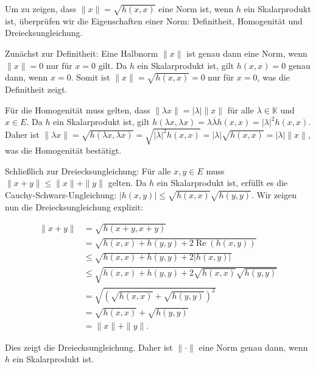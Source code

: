 Um zu zeigen, dass $\|x\| = \sqrt{h(x, x)}$ eine Norm ist, wenn $h$ ein Skalarprodukt ist, überprüfen wir die Eigenschaften einer Norm: Definitheit, Homogenität und Dreiecksungleichung.

Zunächst zur Definitheit: Eine Halbnorm $\|x\|$ ist genau dann eine Norm, wenn $\|x\| = 0$ nur für $x = 0$ gilt. Da $h$ ein Skalarprodukt ist, gilt $h(x, x) = 0$ genau dann, wenn $x = 0$. Somit ist $\|x\| = \sqrt{h(x, x)} = 0$ nur für $x = 0$, was die Definitheit zeigt.

Für die Homogenität muss gelten, dass $\|\lambda x\| = |\lambda| \|x\|$ für alle $\lambda \in \mathbb{K}$ und $x \in E$. Da $h$ ein Skalarprodukt ist, gilt $h(\lambda x, \lambda x) = \lambda \overline{\lambda} h(x, x) = |\lambda|^2 h(x, x)$. Daher ist $\|\lambda x\| = \sqrt{h(\lambda x, \lambda x)} = \sqrt{|\lambda|^2 h(x, x)} = |\lambda| \sqrt{h(x, x)} = |\lambda| \|x\|$, was die Homogenität bestätigt.

Schließlich zur Dreiecksungleichung: Für alle $x, y \in E$ muss $\|x + y\| \leq \|x\| + \|y\|$ gelten. Da $h$ ein Skalarprodukt ist, erfüllt es die Cauchy-Schwarz-Ungleichung: $|h(x, y)| \leq \sqrt{h(x, x)} \sqrt{h(y, y)}$. Wir zeigen nun die Dreiecksungleichung explizit:

\begin{align*}
\|x+y\| &= \sqrt{h(x+y, x+y)} \\
&= \sqrt{h(x, x) + h(y, y) + 2 \operatorname{Re}(h(x, y))} \\
&\leq \sqrt{h(x, x) + h(y, y) + 2|h(x, y)|} \\
&\leq \sqrt{h(x, x) + h(y, y) + 2\sqrt{h(x, x)}\sqrt{h(y, y)}} \\
&= \sqrt{(\sqrt{h(x, x)} + \sqrt{h(y, y)})^2} \\
&= \sqrt{h(x, x)} + \sqrt{h(y, y)} \\
&= \|x\| + \|y\|.
\end{align*}

Dies zeigt die Dreiecksungleichung. Daher ist $\|\cdot\|$ eine Norm genau dann, wenn $h$ ein Skalarprodukt ist.

